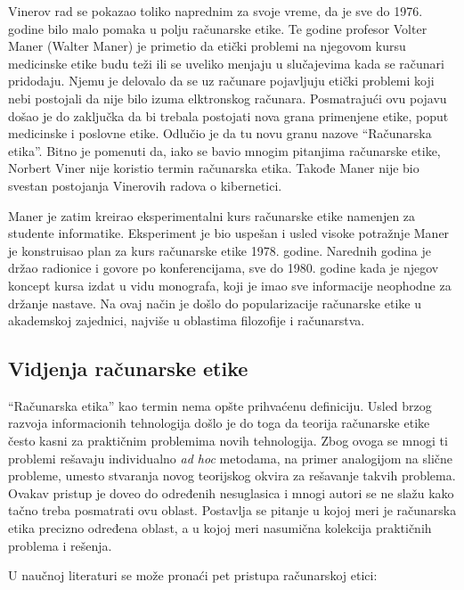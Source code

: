 \documentclass[a4paper]{article}
\begin{document}
Vinerov rad se pokazao toliko naprednim za svoje vreme, da je sve do 1976. godine bilo malo pomaka u polju računarske etike. Te godine profesor Volter Maner (Walter Maner) je primetio da etički problemi na njegovom kursu medicinske etike budu teži ili se uveliko menjaju u slučajevima kada se računari pridodaju. Njemu je delovalo da se uz računare pojavljuju etički problemi koji nebi postojali da nije bilo izuma elktronskog računara. Posmatrajući ovu pojavu došao je do zaključka da bi trebala postojati nova grana primenjene etike, poput medicinske i poslovne etike. Odlučio je da tu novu granu nazove ``Računarska etika''. Bitno je pomenuti da, iako se bavio mnogim pitanjima računarske etike, Norbert Viner nije koristio termin računarska etika. Takođe Maner nije bio svestan postojanja Vinerovih radova o kibernetici.

Maner je zatim kreirao eksperimentalni kurs računarske etike namenjen za studente informatike. Eksperiment je bio uspešan i usled visoke potražnje Maner je konstruisao plan za kurs računarske etike 1978. godine. Narednih godina je držao radionice i govore po konferencijama, sve do 1980. godine kada je njegov koncept kursa izdat u vidu monografa, koji je imao sve informacije neophodne za držanje nastave. Na ovaj način je došlo do popularizacije računarske etike u akademskoj zajednici, najviše u oblastima filozofije i računarstva.



\subsection{Vidjenja računarske etike}
``Računarska etika'' kao termin nema opšte prihvaćenu definiciju. Usled brzog razvoja informacionih tehnologija došlo je do toga da teorija računarske etike često kasni za praktičnim problemima novih tehnologija. Zbog ovoga se mnogi ti problemi rešavaju individualno \textit{ad hoc} metodama, na primer analogijom na slične probleme, umesto stvaranja novog teorijskog okvira za rešavanje takvih problema. Ovakav pristup je doveo do određenih nesuglasica i mnogi autori se ne slažu kako tačno treba posmatrati ovu oblast. Postavlja se pitanje u kojoj meri je računarska etika precizno određena oblast, a u kojoj meri nasumična kolekcija praktičnih problema i rešenja.

U naučnoj literaturi se može pronaći pet pristupa računarskoj etici\cite{floridi}:
\end{document}
